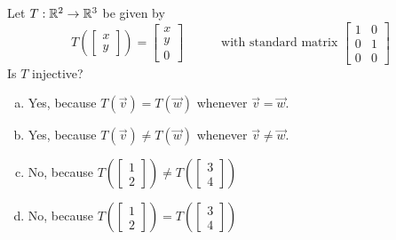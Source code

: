 \begin{activity}{2}
Let \(T: \mathbb{R}^2 \rightarrow \mathbb{R}^3\) be given by
\[
  T\left(\begin{bmatrix}x \\ y \end{bmatrix} \right)
    =
  \begin{bmatrix} x \\ y \\ 0 \end{bmatrix}
    \hspace{3em}
    \text{with standard matrix }
  \begin{bmatrix} 1 & 0 \\ 0 & 1 \\ 0 & 0 \end{bmatrix}
\]
Is \(T\) injective?
\begin{enumerate}[a)]
\item Yes, because \(T(\vec v)=T(\vec w)\) whenever \(\vec v=\vec w\).
\item Yes, because \(T(\vec v)\not=T(\vec w)\) whenever \(\vec v\not=\vec w\).
\item No, because 
  \(
    T\left(\begin{bmatrix}1\\2\end{bmatrix}\right)
      \not=
    T\left(\begin{bmatrix}3\\4\end{bmatrix}\right)
  \)
\item No, because 
  \(
    T\left(\begin{bmatrix}1\\2\end{bmatrix}\right)
      =
    T\left(\begin{bmatrix}3\\4\end{bmatrix}\right)
  \)
\end{enumerate}
\end{activity}

